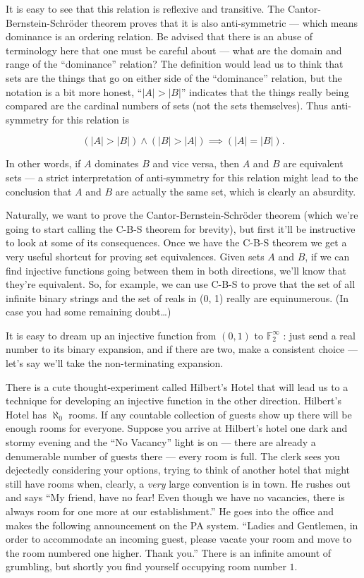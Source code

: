 It is easy to see that this relation is reflexive and transitive.  The Cantor-
Bernstein-Schr\"{o}der theorem proves that it is also anti-symmetric --- which
means dominance is an ordering relation.  Be advised that there is an abuse
of terminology here that one must be careful about --- what are the domain
and range of the ``dominance'' relation?  The definition would lead us to
think that sets are the things that go on either side of the ``dominance''
relation, but the notation is a bit more honest, ``$|A| > |B|$'' 
indicates that the
things really being compared are the cardinal numbers of sets (not the sets
themselves).  Thus anti-symmetry for this relation is

\[ (|A| > |B|) \land (|B| > |A|) \implies (|A| = |B|). \]

In other words, if $A$ dominates $B$ and vice versa, then $A$ and $B$ are
equivalent sets --- a strict interpretation of anti-symmetry for this relation
might lead to the conclusion that $A$ and $B$ are actually the same set, which
is clearly an absurdity.

Naturally, we want to prove the Cantor-Bernstein-Schr\"{o}der theorem (which
we're going to start calling the C-B-S theorem for brevity), but first it'll be
instructive to look at some of its consequences.  Once we have the C-B-S
theorem we get a very useful shortcut for proving set equivalences.  Given
sets $A$ and $B$, if we can find injective functions going between them in both
directions, we'll know that they're equivalent.  So, for example, we can use
C-B-S to prove that the set of all infinite binary strings and the set of reals
in (0, 1) really are equinumerous.  
(In case you had some remaining doubt\ldots )

It is easy to dream up an injective function from $(0, 1)$ 
to ${\mathbb F}_2^\infty$ : just send a
real number to its binary expansion, and if there are two, make a consistent
choice --- let's say we'll take the non-terminating expansion.

There is a cute thought-experiment called Hilbert's Hotel that will lead
us to a technique for developing an injective function in the other direction.
Hilbert's Hotel has $\aleph_0$ rooms.  If any countable collection of 
guests show up there will be enough rooms for everyone.   Suppose you 
arrive at Hilbert's hotel one dark and stormy evening and the 
``No Vacancy'' light is on --- there are already a
denumerable number of guests there --- every room is full.  The clerk 
sees you dejectedly considering your options, trying to think of 
another hotel that might still have rooms when, clearly, a \emph{very} 
large convention is in town.  He rushes out and says 
``My friend, have no fear! Even though we have no vacancies,
there is always room for one more at our establishment.''  
He goes into the office and makes the following announcement 
on the PA system.  ``Ladies and Gentlemen, in order to accommodate 
an incoming guest, please vacate your room and move to the room 
numbered one higher.  Thank you.''  There
is an infinite amount of grumbling, but shortly you find yourself occupying
room number $1$.

